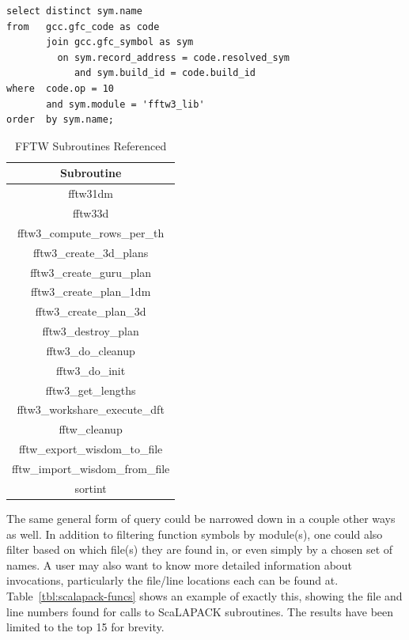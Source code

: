 \begin{lstlisting}[caption=Querying for Use of Library Functions, label=lst:fftw]
select distinct sym.name
from   gcc.gfc_code as code
       join gcc.gfc_symbol as sym
         on sym.record_address = code.resolved_sym
            and sym.build_id = code.build_id
where  code.op = 10
       and sym.module = 'fftw3_lib'
order  by sym.name;
\end{lstlisting}

\begin{table}[htbp]
\caption{FFTW Subroutines Referenced}
\begin{center}
\begin{tabular}{|c|}
\hline
\textbf{Subroutine} \\
\hline
fftw31dm \\
\hline
fftw33d \\
\hline
fftw3\_compute\_rows\_per\_th \\
\hline
fftw3\_create\_3d\_plans \\
\hline
fftw3\_create\_guru\_plan \\
\hline
fftw3\_create\_plan\_1dm \\
\hline
fftw3\_create\_plan\_3d \\
\hline
fftw3\_destroy\_plan \\
\hline
fftw3\_do\_cleanup \\
\hline
fftw3\_do\_init \\
\hline
fftw3\_get\_lengths \\
\hline
fftw3\_workshare\_execute\_dft \\
\hline
fftw\_cleanup \\
\hline
fftw\_export\_wisdom\_to\_file \\
\hline
fftw\_import\_wisdom\_from\_file \\
\hline
sortint \\
\hline
\end{tabular}
\label{tab:fftw-funcs}
\end{center}
\end{table}

The same general form of query could be narrowed down in a couple other ways as well.
In addition to filtering function symbols by module(s), one could also filter based on which file(s) they are found in, or even simply by a chosen set of names.
A user may also want to know more detailed information about invocations, particularly the file/line locations each can be found at.
Table~\ref{tbl:scalapack-funcs} shows an example of exactly this, showing the file and line numbers found for calls to ScaLAPACK subroutines.
The results have been limited to the top 15 for brevity.

